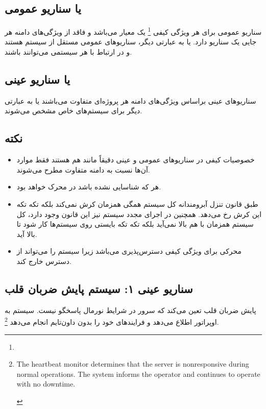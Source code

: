 \subsection{ یا سناریو عمومی}

سناریو عمومی برای هر ویژگی کیفی \footnote{} یک معیار
می‌باشد و فاقد از ویژگی‌های دامنه هر جایی یک سناریو دارد. یا به عبارتی دیگر،
سناریو‌های عمومی مستقل از سیستم هستند و در ارتباط با هر سیستمی می‌توانند باشند.

\subsection{ یا سناریو عینی}

سناریو‌های عینی براساس ویژگی‌های دامنه هر پروژه‌ای متفاوت می‌باشند یا به عبارتی
دیگر برای سیستم‌های خاص مشخص می‌شوند.

\subsection*{نکته}

\begin{itemize}
    \item خصوصیات کیفی در سناریو‌های عمومی و عینی دقیقاً مانند هم هستند فقط
    موارد‌ آن‌ها نسبت به دامنه متفاوت مطرح می‌شوند.
    \item هر  که شناسایی نشده باشد در محرک خواهد بود.
    \item طبق قانون تنزل آبرومندانه کل سیستم همگی همزمان کرش نمی‌کند بلکه تکه
    تکه این کرش رخ می‌دهد. همچنین در اجرای مجدد سیستم نیز این قانون وجود دارد،
    کل سیستم همزمان با هم بالا نمی‌آید بلکه تکه تکه بایستی روی سیستم‌ها کار شود
    تا بالا آید.
    \item {} محرکی برای ویژگی کیفی دسترس‌پذیری می‌باشد زیرا سیستم را
    می‌تواند از دسترس خارج کند.
\end{itemize}

\subsection{سناریو عینی ۱: سیستم پایش ضربان قلب}

پایش ضربان قلب تعین می‌کند که سرور در شرایط نورمال پاسخگو نیست. سیستم به
اوپراتور اطلاع می‌دهد و فرایند‌های خود را بدون داون‌تایم انجام می‌دهد
\footnote{\begin{LTR}
    The heartbeat monitor determines that the server is nonresponsive during
    normal operations. The system informs the operator and continues to operate
    with no downtime.
\end{LTR}}.

